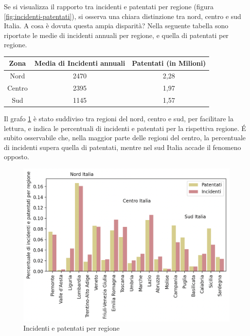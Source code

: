 \documentclass[a4paper]{report}
\begin{document}
Se si visualizza il rapporto tra incidenti e patentati per regione (figura \ref{fig:incidenti-patentati}), 
si osserva una chiara distinzione tra nord, centro e sud Italia.
A cosa è dovuta questa ampia disparità?
Nella seguente tabella sono riportate le medie di incidenti annuali per regione, 
e quella di patentati per regione.

\begin{center}
    \def\arraystretch{1.5}%
    \begin{tabular}{ |c|c|c| } 
    \hline
    Zona & Media di Incidenti annuali & Patentati (in Milioni) \\ 
    \hline
    \rowcolor{TableGray}
    Nord    &   2470 &   2,28 \\ 
    Centro  &   2395 &   1,97 \\ 
    \rowcolor{TableGray}
    Sud     &   1145 &   1,57 \\ 
    \hline
    \end{tabular}
\end{center}

Il grafo \ref{fig:incidenti-patentati-bar} è stato suddiviso tra regioni del nord, centro e sud, per facilitare 
la lettura, e indica le percentuali di incidenti e patentati per la rispettiva regione. 
\'E subito osservabile che, nella maggior parte delle regioni del centro, la percentuale di incidenti 
supera quella di patentati, mentre nel sud Italia accade il fenomeno opposto.

\begin{figure}
    \includegraphics[width=\linewidth]{../src/incidenti/incidenti_aci/mappe_regioni/incidenti_patenti_bar.png}
    \caption{Incidenti e patentati per regione}
    \label{fig:incidenti-patentati-bar}
\end{figure}
\end{document}
